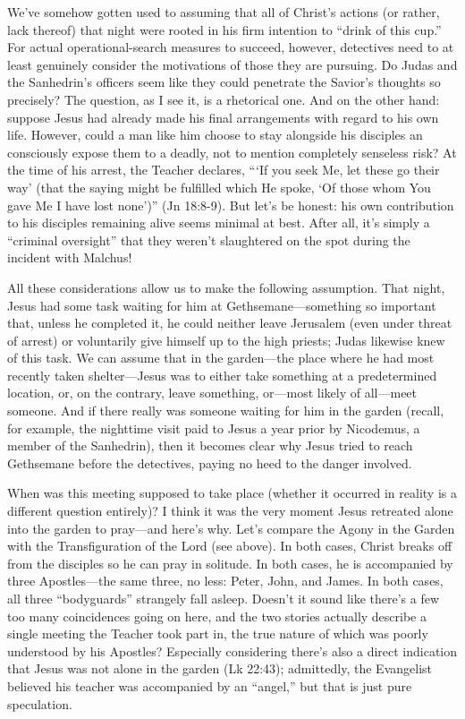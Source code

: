 We've somehow gotten used to assuming that all of Christ's actions (or rather, lack thereof) that night were rooted in his firm intention to ``drink of this cup.'' For actual operational-search measures to succeed, however, detectives need to at least genuinely consider the motivations of those they are pursuing. Do Judas and the Sanhedrin's officers seem like they could penetrate the Savior's thoughts so precisely? The question, as I see it, is a rhetorical one. And on the other hand: suppose Jesus had already made his final arrangements with regard to his own life. However, could a man like him choose to stay alongside his disciples an consciously expose them to a deadly, not to mention completely senseless risk? At the time of his arrest, the Teacher declares, ```If you seek Me, let these go their way' (that the saying might be fulfilled which He spoke, `Of those whom You gave Me I have lost none')'' (Jn 18:8-9). But let's be honest: his own contribution to his disciples remaining alive seems minimal at best. After all, it's simply a ``criminal oversight'' that they weren't slaughtered on the spot during the incident with Malchus!

All these considerations allow us to make the following assumption. That night, Jesus had some task waiting for him at Gethsemane---something so important that, unless he completed it, he could neither leave Jerusalem (even under threat of arrest) or voluntarily give himself up to the high priests; Judas likewise knew of this task. We can assume that in the garden---the place where he had most recently taken shelter---Jesus was to either take something at a predetermined location, or, on the contrary, leave something, or---most likely of all---meet someone. And if there really was someone waiting for him in the garden (recall, for example, the nighttime visit paid to Jesus a year prior by Nicodemus, a member of the Sanhedrin), then it becomes clear why Jesus tried to reach Gethsemane before the detectives, paying no heed to the danger involved.

When was this meeting supposed to take place (whether it occurred in reality is a different question entirely)? I think it was the very moment Jesus retreated alone into the garden to pray---and here's why. Let's compare the Agony in the Garden with the Transfiguration of the Lord (see above). In both cases, Christ breaks off from the disciples so he can pray in solitude. In both cases, he is accompanied by three Apostles---the same three, no less: Peter, John, and James. In both cases, all three ``bodyguards'' strangely fall asleep. Doesn't it sound like there's a few too many coincidences going on here, and the two stories actually describe a single meeting the Teacher took part in, the true nature of which was poorly understood by his Apostles? Especially considering there's also a direct indication that Jesus was not alone in the garden (Lk 22:43); admittedly, the Evangelist believed his teacher was accompanied by an ``angel,'' but that is just pure speculation.

